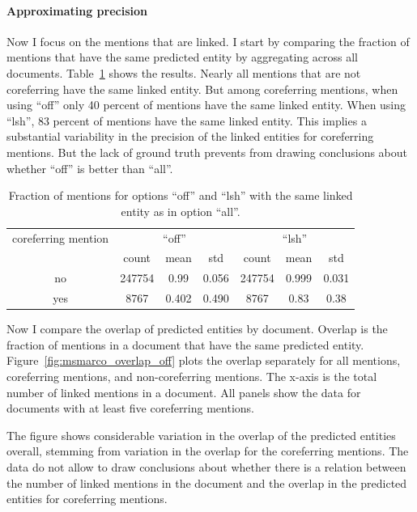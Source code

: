 \documentclass[a4paper,11pt]{article}
\numberwithin{equation}{section} %
\begin{document}
\paragraph{Approximating precision}
Now I focus on the mentions that are linked. I start by comparing the fraction of mentions that have the same predicted entity by aggregating across all documents. Table~\ref{tab:performance_msmarco_avg} shows the results.
Nearly all mentions that are not coreferring have the same linked entity. 
But among coreferring mentions, when using ``off'' only 40 percent of mentions have the same linked entity. When using ``lsh'', 83 percent of mentions have the same linked entity.
This implies a substantial variability in the precision of the linked entities for coreferring mentions. But the lack of ground truth prevents from drawing conclusions about whether ``off'' is better than ``all''.  

\begin{table}
 \begin{tabular}{c c c c c c c}
 \hline
 coreferring mention   & \multicolumn{3}{c}{``off''} & \multicolumn{3}{c}{``lsh''} \\
    & count & mean & std & count & mean & std \\
 \hline 
 no & 247754 & 0.99 & 0.056 & 247754 &	0.999 &	0.031 \\  
 yes & 8767 & 0.402 & 0.490 & 8767 & 0.83   &	0.38	 \\ 
\hline 
\end{tabular}
\caption{Fraction of mentions for options ``off'' and ``lsh'' with the same linked entity as in option ``all''.}
\label{tab:performance_msmarco_avg}
\end{table}

Now I compare the overlap of predicted entities by document. Overlap is the fraction of mentions in a document that have the same predicted entity. 
Figure~\ref{fig:msmarco_overlap_off} plots the overlap separately for all mentions, coreferring mentions, and non-coreferring mentions. The x-axis is the total number of linked mentions in a document.
All panels show the data for documents with at least five coreferring mentions.

The figure shows considerable variation in the overlap of the predicted entities overall, stemming from variation in the overlap for the coreferring mentions. The data do not allow to draw conclusions about whether there is a relation between the number of linked mentions in the document and the overlap in the predicted entities for coreferring mentions.
\end{document}
